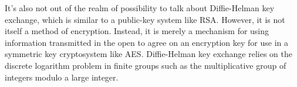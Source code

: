 It's also not out of the realm of possibility to talk about
Diffie-Helman key exchange, which is similar to a public-key system
like RSA. However, it is not itself a method of encryption. Instead,
it is merely a mechanism for using information transmitted in the open
to agree on an encryption key for use in a symmetric key cryptosystem
like AES. Diffie-Helman key exchange relies on the discrete logarithm
problem in finite groups such as the multiplicative group of integers
modulo a large integer.

